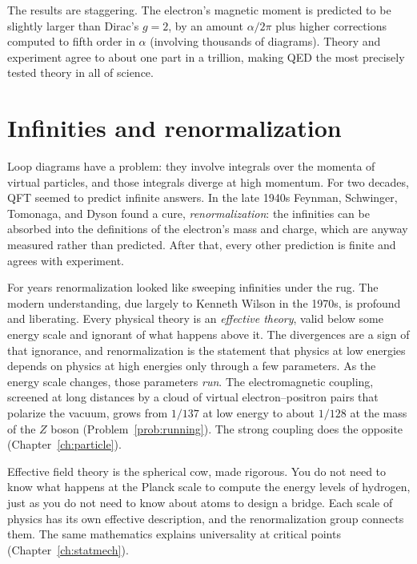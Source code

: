 The results are staggering. The electron's magnetic moment is predicted to be slightly larger than Dirac's $g=2$, by an amount $\alpha/2\pi$ plus higher corrections computed to fifth order in $\alpha$ (involving thousands of diagrams). Theory and experiment agree to about one part in a trillion, making QED the most precisely tested theory in all of science.

\section{Infinities and renormalization}

Loop diagrams have a problem: they involve integrals over the momenta of virtual particles, and those integrals diverge at high momentum. For two decades, QFT seemed to predict infinite answers. In the late 1940s Feynman, Schwinger, Tomonaga, and Dyson found a cure, \emph{renormalization}: the infinities can be absorbed into the definitions of the electron's mass and charge, which are anyway measured rather than predicted. After that, every other prediction is finite and agrees with experiment.

For years renormalization looked like sweeping infinities under the rug. The modern understanding, due largely to Kenneth Wilson in the 1970s, is profound and liberating. Every physical theory is an \emph{effective theory}, valid below some energy scale and ignorant of what happens above it. The divergences are a sign of that ignorance, and renormalization is the statement that physics at low energies depends on physics at high energies only through a few parameters. As the energy scale changes, those parameters \emph{run}. The electromagnetic coupling, screened at long distances by a cloud of virtual electron--positron pairs that polarize the vacuum, grows from $1/137$ at low energy to about $1/128$ at the mass of the $Z$ boson (Problem~\ref{prob:running}). The strong coupling does the opposite (Chapter~\ref{ch:particle}).

\begin{keyidea}
Effective field theory is the spherical cow, made rigorous. You do not need to know what happens at the Planck scale to compute the energy levels of hydrogen, just as you do not need to know about atoms to design a bridge. Each scale of physics has its own effective description, and the renormalization group connects them. The same mathematics explains universality at critical points (Chapter~\ref{ch:statmech}).
\end{keyidea}

